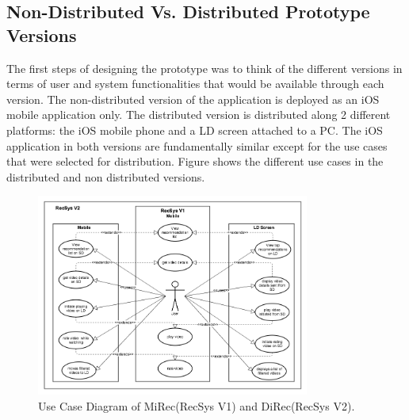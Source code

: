 \subsection{Non-Distributed Vs. Distributed Prototype Versions}
The first steps of designing the prototype was to think of the different versions in terms of user and system functionalities that would be available through each version.
The non-distributed version of the application is deployed as an iOS mobile application only. The distributed version is distributed along 2 different platforms: the iOS mobile phone and a LD screen attached to a PC. The iOS application in both versions are fundamentally similar except for the use cases that were selected for distribution. Figure shows the different use cases in the distributed and non distributed versions.
\begin{figure}[h]
\includegraphics[width=0.8\textwidth, center, center]{figures/usecase}
\caption{Use Case Diagram of MiRec(RecSys V1) and DiRec(RecSys V2).}
\label{fig:figure42}
\end{figure}
